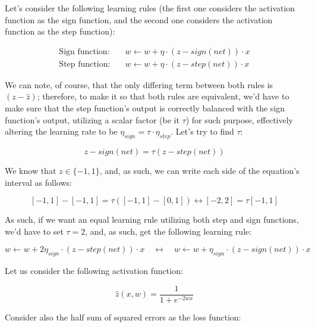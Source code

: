 \documentclass[12pt]{article}
\begin{document}
\begin{enumerate}[leftmargin=\labelsep]
\begin{enumerate}
{      Let's consider the following learning rules (the first one considers
      the activation function as the sign function, and the second one
      considers the activation function as the step function):

      \begin{align*}
        \text{Sign function:} \quad & w \leftarrow w + \eta \cdot (z - sign(net)) \cdot x \\
        \text{Step function:} \quad & w \leftarrow w + \eta \cdot (z - step(net)) \cdot x
      \end{align*}

      We can note, of course, that the only differing term between both rules
      is $(z - \hat{z})$; therefore, to make it so that both rules are
      equivalent, we'd have to make sure that the step function's output
      is correctly balanced with the sign function's output, utilizing a scalar
      factor (be it $\tau$) for such purpose, effectively altering the learning
      rate to be $\eta_{sign} = \tau \cdot \eta_{step}$. Let's try to find $\tau$:

      $$
      z - sign(net) = \tau (z - step(net))
      $$

      We know that $z \in \{-1, 1\}$, and, as such, we can write each side of
      the equation's interval as follows:

      $$
      [-1, 1] - [-1, 1] = \tau ([-1, 1] - [0, 1]) \leftrightarrow
      [-2, 2] = \tau [-1, 1]
      $$

      As such, if we want an equal learning rule utilizing both step and sign
      functions, we'd have to set $\tau = 2$, and, as such, get the following
      learning rule:

      $$
        w \leftarrow w + 2 \eta_{sign} \cdot (z - step(net)) \cdot x \quad \leftrightarrow \quad
        w \leftarrow w + \eta_{sign} \cdot (z - sign(net)) \cdot x
      $$
    }
  \end{enumerate}

  \begin{tcolorbox}[enhanced jigsaw,colback=bg,boxrule=0pt,arc=1pt,halign=center]
    \item Let us consider the following activation function:

    \begin{equation*}
      \hat{z}(x, w) = \frac{1}{1 + e^{-2 w x}}
    \end{equation*}

    Consider also the half sum of squared errors as the loss function:


\end{tcolorbox}
\end{enumerate}
\end{document}
